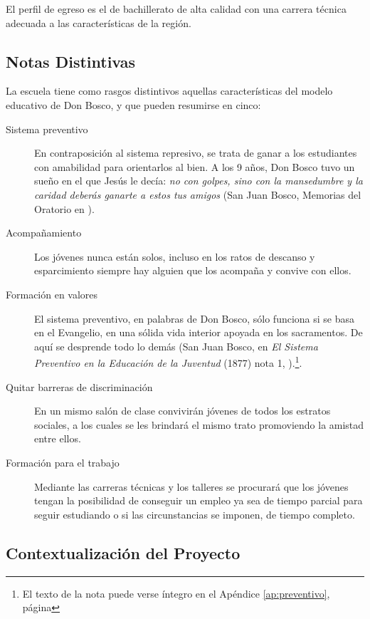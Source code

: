 El perfil de egreso es el de bachillerato de alta calidad con una carrera técnica adecuada a las características de la región.

\subsection{Notas Distintivas}
\label{sub:intro:NotasDistintivas}

La escuela tiene como rasgos distintivos aquellas características del modelo educativo de Don Bosco, y que pueden resumirse en cinco:

\begin{description}
	\item[Sistema preventivo] En contraposición al sistema represivo, se trata de ganar a los estudiantes con amabilidad para orientarlos al bien. A los 9 años, Don Bosco tuvo un sueño en el que Jesús le decía: \emph{no con golpes, sino con la mansedumbre y la caridad deberás ganarte a estos tus amigos} (San Juan Bosco, Memorias del Oratorio en \citep{Canals95}).

	\item[Acompañamiento] Los jóvenes nunca están solos, incluso en los ratos de descanso y esparcimiento siempre hay alguien que los acompaña y convive con ellos.
	
	\item[Formación en valores] El sistema preventivo, en palabras de Don Bosco, sólo funciona si se basa en el Evangelio, en una sólida vida interior apoyada en los sacramentos. De aquí se desprende todo lo demás (San Juan Bosco, en \emph{El Sistema Preventivo en la Educación de la Juventud} (1877) nota 1, \citep{Canals95}).\footnote{El texto de la nota puede verse íntegro en el Apéndice \ref{ap:preventivo}, página \pageref{ap:preventivo}}.

	\item[Quitar barreras de discriminación] En un mismo salón de clase convivirán jóvenes de todos los estratos sociales, a los cuales se les brindará el mismo trato promoviendo la amistad entre ellos.

	\item[Formación para el trabajo] Mediante las carreras técnicas y los talleres se procurará que los jóvenes tengan la posibilidad de conseguir un empleo ya sea de tiempo parcial para seguir estudiando o si las circunstancias se imponen, de tiempo completo.
\end{description}

\subsection{Contextualización del Proyecto}

